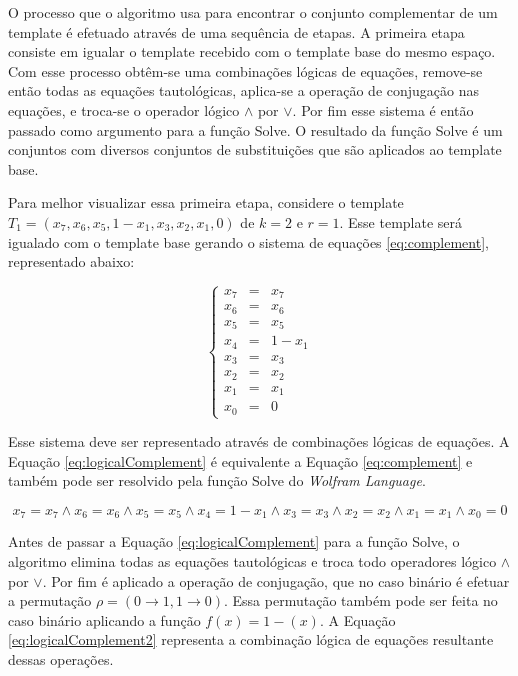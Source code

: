 	O processo que o algoritmo usa para encontrar o conjunto complementar de um template é efetuado através de uma sequência de etapas. A primeira etapa consiste em igualar o template recebido com o template base do mesmo espaço. Com esse processo obtêm-se uma combinações lógicas de equações, remove-se então todas as equações tautológicas, aplica-se a operação de conjugação nas equações, e troca-se o operador lógico $\wedge$ por $\vee$. Por fim esse sistema é então passado como argumento para a função Solve. O resultado da função Solve é um conjuntos com diversos conjuntos de substituições que são aplicados ao template base.

	Para melhor visualizar essa primeira etapa, considere o template $T_1 = (x_7, x_6, x_5, 1 - x_1, x_3, x_2, x_1, 0)$ de $k=2$ e $r=1$. Esse template será igualado com o template base gerando o sistema de equações \ref{eq:complement}, representado abaixo:
	
	\begin{equation}
	\left\{\begin{matrix}
	x_7 & = & x_7	\\ 
	x_6 & = & x_6	\\ 
	x_5 & = & x_5	\\ 
	x_4 & = & 1 - x_1 \\ 
	x_3 & = & x_3	\\ 
	x_2 & = & x_2	\\ 
	x_1 & = & x_1	\\ 
	x_0 & = & 0
	\end{matrix}\right.
	\label{eq:complement}
	\end{equation}

	Esse sistema deve ser representado através de combinações lógicas de equações. A Equação \ref{eq:logicalComplement} é equivalente a Equação \ref{eq:complement} e também pode ser resolvido pela função Solve do \textit{Wolfram Language}.

	\begin{equation}
	x_7 = x_7	\wedge  
	x_6 = x_6	\wedge  
	x_5 = x_5	\wedge  
	x_4 = 1 - x_1 \wedge  
	x_3 = x_3	\wedge  
	x_2 = x_2	\wedge  
	x_1 = x_1	\wedge  
	x_0 = 0
	\label{eq:logicalComplement}
	\end{equation}

	Antes de passar a Equação \ref{eq:logicalComplement} para a função Solve, o algoritmo elimina todas as equações tautológicas e troca todo operadores lógico $\wedge$ por $\vee$. Por fim é aplicado a operação de conjugação, que no caso binário é efetuar a permutação $\rho = (0 \rightarrow 1, 1 \rightarrow 0)$. Essa permutação também pode ser feita no caso binário aplicando a função $f(x) = 1 - (x)$. A Equação \ref{eq:logicalComplement2} representa a combinação lógica de equações resultante dessas operações.

